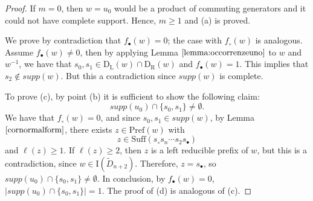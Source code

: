 \documentclass{amsart}
\newcommand{\D}{{\widetilde{D}_{n+2}}}
\newcommand{\ld}{{\mathrm{D}_{\mathrm{L}}}}
\newcommand{\rd}{{\mathrm{D}_{\mathrm{R}}}}
\newcommand{\s}{{s_{\bullet}}}
\newcommand{\sn}{{s_\circ}}
\newcommand{\su}{\mathrm{Suff}}
\newcommand{\pr}{\mathrm{Pref}}
\newcommand{\I}{\mathrm{I}}
\theoremstyle{definition}
\begin{document}
\begin{proof}

If $m=0$, then $w=u_0$ would be a product of commuting generators and it could not have complete support. Hence, $m\ge 1$ and (a) is proved. 

We prove by contradiction that $f_\bullet(w)=0$; the case with $f_\circ(w)$ is analogous. Assume $f_\bullet(w)\ne 0$, then by applying Lemma $\ref{lemma:occorrenzeuno}$ to $w$ and $w^{-1}$, we have that $s_0,s_1\in \ld(w)\cap \rd(w)$ and $f_\bullet(w)=1$.  This implies that $s_2\notin supp(w)$. But this a contradiction since $supp(w)$ is complete. 

To prove (c), by point (b) it is sufficient to show the following claim: 
$$ supp(u_0)\cap \{s_0,s_1\}\ne \emptyset.$$ 
We have that $f_\circ(w)=0$, and since $s_0,s_1\in supp(w)$, by Lemma $\ref{cornormalform}$, there exists $z\in \pr(w)$ with \[z\in \su(\sn s_n \cdots s_2 \s)\] and $\ell(z)\ge 1$. If $\ell(z)\ge 2$, then $z$ is a left reducible prefix of $w$, but this is a contradiction, since $w\in \I(\D)$. Therefore, $z=\s$, so $supp(u_0)\cap \{s_0,s_1\}\ne \emptyset$. In conclusion, by $f_\bullet(w)=0$, $\left |supp(u_0)\cap \{s_0,s_1\}\right |=1$. The proof of (d) is analogous of (c). 

\end{proof}
\end{document}
